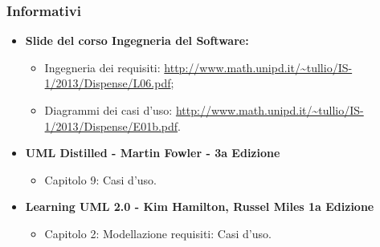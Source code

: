 \subsubsection{Informativi}
\begin{itemize}
	\item\textbf{Slide del corso Ingegneria del Software:}
	\begin{itemize}
		\item Ingegneria dei requisiti: \url{http://www.math.unipd.it/~tullio/IS-1/2013/Dispense/L06.pdf};
		\item Diagrammi dei casi d'uso\glossario{}: \url{http://www.math.unipd.it/~tullio/IS-1/2013/Dispense/E01b.pdf}.
	\end{itemize}
	\item\textbf{UML\glossario{} Distilled - Martin Fowler - 3a Edizione}
	\begin{itemize}
		\item Capitolo 9: Casi d'uso\glossario{}.
	\end{itemize}
	\item \textbf{Learning UML\glossario{} 2.0 - Kim Hamilton, Russel Miles 1a Edizione}
	\begin{itemize}
		\item Capitolo 2: Modellazione requisiti: Casi d'uso\glossario{}.
	\end{itemize}
\end{itemize}